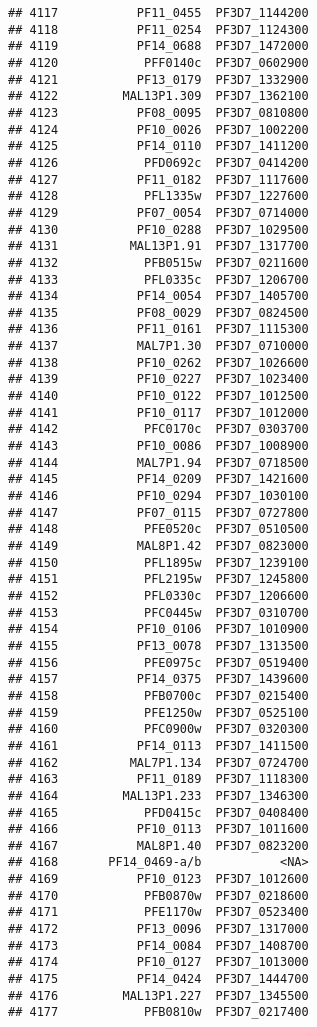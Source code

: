 \documentclass[12pt, a4paper]{article}\usepackage[]{graphicx}\usepackage[]{color}
\makeatletter
\newenvironment{kframe}{%
 \def\at@end@of@kframe{}%
 \ifinner\ifhmode%
  \def\at@end@of@kframe{\end{minipage}}%
  \begin{minipage}{\columnwidth}%
 \fi\fi%
 \def\FrameCommand##1{\hskip\@totalleftmargin \hskip-\fboxsep
 \colorbox{shadecolor}{##1}\hskip-\fboxsep
     \hskip-\linewidth \hskip-\@totalleftmargin \hskip\columnwidth}%
 \MakeFramed {\advance\hsize-\width
   \@totalleftmargin\z@ \linewidth\hsize
   \@setminipage}}%
 {\par\unskip\endMakeFramed%
 \at@end@of@kframe}
\newenvironment{knitrout}{}{} %
\makeatother
\begin{document}
\begin{knitrout}
\begin{kframe}
\begin{verbatim}
## 4117           PF11_0455  PF3D7_1144200
## 4118           PF11_0254  PF3D7_1124300
## 4119           PF14_0688  PF3D7_1472000
## 4120            PFF0140c  PF3D7_0602900
## 4121           PF13_0179  PF3D7_1332900
## 4122         MAL13P1.309  PF3D7_1362100
## 4123           PF08_0095  PF3D7_0810800
## 4124           PF10_0026  PF3D7_1002200
## 4125           PF14_0110  PF3D7_1411200
## 4126            PFD0692c  PF3D7_0414200
## 4127           PF11_0182  PF3D7_1117600
## 4128            PFL1335w  PF3D7_1227600
## 4129           PF07_0054  PF3D7_0714000
## 4130           PF10_0288  PF3D7_1029500
## 4131          MAL13P1.91  PF3D7_1317700
## 4132            PFB0515w  PF3D7_0211600
## 4133            PFL0335c  PF3D7_1206700
## 4134           PF14_0054  PF3D7_1405700
## 4135           PF08_0029  PF3D7_0824500
## 4136           PF11_0161  PF3D7_1115300
## 4137           MAL7P1.30  PF3D7_0710000
## 4138           PF10_0262  PF3D7_1026600
## 4139           PF10_0227  PF3D7_1023400
## 4140           PF10_0122  PF3D7_1012500
## 4141           PF10_0117  PF3D7_1012000
## 4142            PFC0170c  PF3D7_0303700
## 4143           PF10_0086  PF3D7_1008900
## 4144           MAL7P1.94  PF3D7_0718500
## 4145           PF14_0209  PF3D7_1421600
## 4146           PF10_0294  PF3D7_1030100
## 4147           PF07_0115  PF3D7_0727800
## 4148            PFE0520c  PF3D7_0510500
## 4149           MAL8P1.42  PF3D7_0823000
## 4150            PFL1895w  PF3D7_1239100
## 4151            PFL2195w  PF3D7_1245800
## 4152            PFL0330c  PF3D7_1206600
## 4153            PFC0445w  PF3D7_0310700
## 4154           PF10_0106  PF3D7_1010900
## 4155           PF13_0078  PF3D7_1313500
## 4156            PFE0975c  PF3D7_0519400
## 4157           PF14_0375  PF3D7_1439600
## 4158            PFB0700c  PF3D7_0215400
## 4159            PFE1250w  PF3D7_0525100
## 4160            PFC0900w  PF3D7_0320300
## 4161           PF14_0113  PF3D7_1411500
## 4162          MAL7P1.134  PF3D7_0724700
## 4163           PF11_0189  PF3D7_1118300
## 4164         MAL13P1.233  PF3D7_1346300
## 4165            PFD0415c  PF3D7_0408400
## 4166           PF10_0113  PF3D7_1011600
## 4167           MAL8P1.40  PF3D7_0823200
## 4168       PF14_0469-a/b           <NA>
## 4169           PF10_0123  PF3D7_1012600
## 4170            PFB0870w  PF3D7_0218600
## 4171            PFE1170w  PF3D7_0523400
## 4172           PF13_0096  PF3D7_1317000
## 4173           PF14_0084  PF3D7_1408700
## 4174           PF10_0127  PF3D7_1013000
## 4175           PF14_0424  PF3D7_1444700
## 4176         MAL13P1.227  PF3D7_1345500
## 4177            PFB0810w  PF3D7_0217400

\end{verbatim}
\end{kframe}
\end{knitrout}
\end{document}

